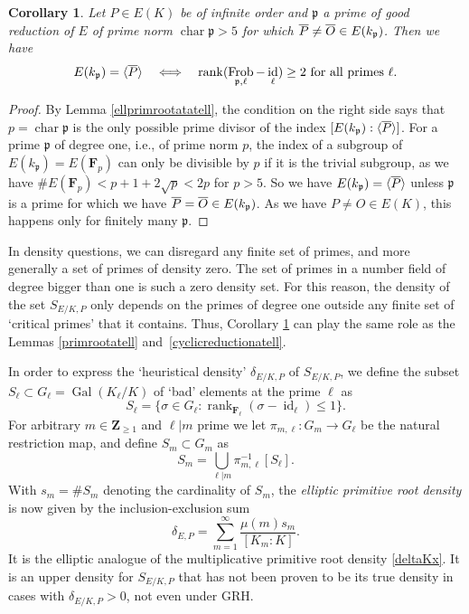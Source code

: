\documentclass{amsart}
\theoremstyle{plain}
\newtheorem{corollary}[theorem]{Corollary}
\theoremstyle{definition}
\DeclareMathOperator{\characteristic}{char}
\DeclareMathOperator{\Frob}{Frob}
\DeclareMathOperator{\id}{id}
\DeclareMathOperator{\Gal}{Gal}
\DeclareMathOperator{\rank}{rank}
\newcommand{\FF}{{\mathbf{F}}}
\newcommand{\Zee}{{\mathbf{Z}}}
\newcommand{\gothp}{{\mathfrak{p}}}
\newcommand{\mybar}[1]{
  \mathchoice
  {#1\llap{$\overline{\phantom{\displaystyle\rm#1}}$}}
  {#1\llap{$\overline{\phantom{\textstyle\rm#1}}$}}
  {#1\llap{$\overline{\phantom{\scriptstyle\rm#1}}$}}
  {#1\llap{$\overline{\phantom{\scriptscriptstyle\rm#1}}$}}
}
\renewcommand{\bar}{\mybar}
\begin{document}
\begin{corollary}
\label{LTcondition}
Let $P\in E(K)$ be of infinite order and $\gothp$ a prime of 
good reduction of $E$ of prime norm $\characteristic{\gothp}>5$ 
for which $\bar P\ne \bar O\in E(k_\gothp)$.
Then we have
\[
E(k_\gothp)=\langle {\bar P}\rangle
\quad \Longleftrightarrow \quad 
\rank (\Frob_{\gothp,\ell} - \id_\ell)\ge 2
\text{ for all primes $\ell$}.
\]
\end{corollary}
\begin{proof}
By Lemma \ref{ellprimrootatatell}, the condition on the right 
side says that $p=\characteristic{\gothp}$ is the only possible
prime divisor of the index 
$[E(k_\gothp):\langle {\bar P}\rangle ]$.
For a prime $\gothp$ of degree one, i.e., of prime norm $p$,
the index of a subgroup
of $E(k_\gothp)=E(\FF_p)$ can only be divisible by $p$ 
if it is the trivial subgroup, as we have 
$\#E(\FF_p)< p+1+2\sqrt p<2p$ for $p>5$.
So we have $E(k_\gothp)=\langle {\bar P}\rangle$ unless 
$\gothp$ is a prime for which we have 
$\bar P = \bar O\in E(k_\gothp)$.
As we have $P\ne O\in E(K)$, this happens only for finitely 
many $\gothp$.
\end{proof}
\noindent
In density questions, we can disregard any finite set of primes, and more generally a set of primes of density zero.
The set of primes in a number field of degree bigger than one is such a zero density set.
For this reason, the density of the set
$S_{E/K,P}$ only depends on the primes of degree one outside any finite set of `critical primes' that it contains.
Thus, Corollary \ref{LTcondition} can play the same role as the 
Lemmas \ref{primrootatell} and~\ref{cyclicreductionatell}.

In order to express the `heuristical density' 
$\delta_{E/K, P}$ of $S_{E/K,P}$,
we define the subset 
$S_\ell\subset G_\ell=\Gal(K_\ell/K)$ 
of `bad' elements at the prime $\ell$ as
\[
S_\ell=\{\sigma\in G_\ell: 
\rank_{\FF_\ell} (\sigma - \id_\ell)\le 1\}.
\]
For arbitrary $m\in\Zee_{\ge1}$ and $\ell|m$ prime we let $\pi_{m,\ell}:G_m\to G_\ell$ be the natural
restriction map, and define $S_m\subset G_m$ as 
\[
S_m=\bigcup_{\ell|m}  \pi_{m,\ell}^{-1}[S_\ell].
\]
With $s_m=\#S_m$ denoting the cardinality of $S_m$, the \emph{elliptic primitive root density}
is now given by the inclusion-exclusion sum  
\begin{equation}
\label{deltaEP}
\delta_{E,P}=
\sum_{m=1}^{\infty} \frac{\mu(m)s_m}{[K_m:K]}.
\end{equation}
It is the elliptic analogue of the multiplicative primitive root density \eqref{deltaKx}.
It is an upper density for $S_{E/K,P}$ that has not been proven to be its true density 
in cases with $\delta_{E/K, P}>0$, not even under GRH.
\end{document}
